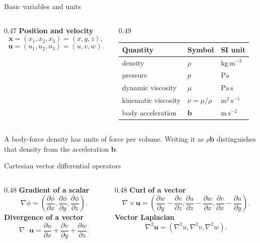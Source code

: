 \documentclass[aspectratio=169,11pt]{beamer}
\newcommand{\uvec}{\bm{u}}
\newcommand{\xvec}{\bm{x}}
\newcommand{\bvec}{\bm{b}}
\begin{document}
\begin{frame}{Basic variables and units}
\begin{columns}[T,onlytextwidth]
\begin{column}{0.47\textwidth}
\textbf{Position and velocity}
\[
  \xvec=(x_1,x_2,x_3)=(x,y,z),
\]
\[
  \uvec=(u_1,u_2,u_3)=(u,v,w).
\]
\end{column}
\begin{column}{0.49\textwidth}
\begin{center}
\renewcommand{\arraystretch}{1.25}
\begin{tabular}{lll}
\toprule
Quantity & Symbol & SI unit \\
\midrule
density & $\rho$ & $\mathrm{kg\,m^{-3}}$ \\
pressure & $p$ & $\mathrm{Pa}$ \\
dynamic viscosity & $\mu$ & $\mathrm{Pa\,s}$ \\
kinematic viscosity & $\nu=\mu/\rho$ & $\mathrm{m^2\,s^{-1}}$ \\
body acceleration & $\bvec$ & $\mathrm{m\,s^{-2}}$ \\
\bottomrule
\end{tabular}
\end{center}
\end{column}
\end{columns}
\begin{punchbox}
\small A body-force density has units of force per volume. Writing it as $\rho\bvec$ distinguishes that density from the acceleration $\bvec$.
\end{punchbox}
\end{frame}

\begin{frame}{Cartesian vector differential operators}
\small
\begin{columns}[T,onlytextwidth]
\begin{column}{0.48\textwidth}
\textbf{Gradient of a scalar}
\[
  \nabla\phi=
  \left(\frac{\partial\phi}{\partial x},
  \frac{\partial\phi}{\partial y},
  \frac{\partial\phi}{\partial z}\right).
\]
\textbf{Divergence of a vector}
\[
  \nabla\cdot\uvec=
  \frac{\partial u}{\partial x}
  +\frac{\partial v}{\partial y}
  +\frac{\partial w}{\partial z}.
\]
\end{column}
\begin{column}{0.48\textwidth}
\textbf{Curl of a vector}
\[
  \nabla\times\uvec=
  \left(
  \frac{\partial w}{\partial y}-\frac{\partial v}{\partial z},
  \frac{\partial u}{\partial z}-\frac{\partial w}{\partial x},
  \frac{\partial v}{\partial x}-\frac{\partial u}{\partial y}
  \right).
\]
\textbf{Vector Laplacian}
\[
  \nabla^2\uvec=(\nabla^2u,\nabla^2v,\nabla^2w).
\]
\end{column}
\end{columns}
\end{frame}
\end{document}
